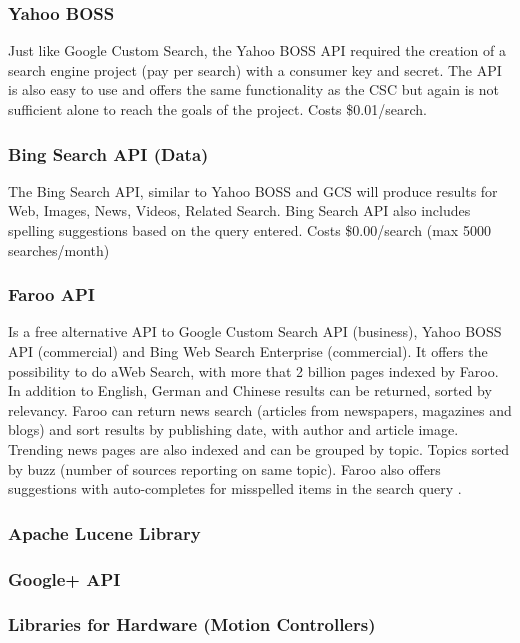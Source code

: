 \documentclass[10pt]{article}
\begin{document}
\subsubsection{Yahoo BOSS}
Just like Google Custom Search, the Yahoo BOSS API required the creation of a search engine project (pay per search) with a consumer key and secret. The API is also easy to use and offers the same functionality as the CSC but again is not sufficient alone to reach the goals of the project. Costs \$0.01/search.

\subsubsection{Bing Search API (Data)}
The Bing Search API, similar to Yahoo BOSS and GCS will produce results for Web, Images, News, Videos, Related Search. Bing Search API also includes spelling suggestions based on the query entered. Costs \$0.00/search (max 5000 searches/month)

\subsubsection{Faroo API}
Is a free alternative API to Google Custom Search API (business), Yahoo BOSS API  (commercial) and Bing Web Search Enterprise (commercial). It offers the possibility to do aWeb Search, with more that 2 billion pages indexed by Faroo. In addition to English, German and Chinese results can be returned, sorted by relevancy.  Faroo can return news search (articles from newspapers, magazines and blogs) and sort results by publishing date, with author and article image. Trending news pages are also indexed and can be grouped by topic. Topics sorted by buzz (number of sources reporting on same topic). Faroo also offers suggestions with auto-completes for misspelled items in the search query \cite{faroo}.

\subsubsection{Apache Lucene Library}

\subsubsection{Google+ API}
\subsubsection{Libraries for Hardware (Motion Controllers)}
\end{document}
